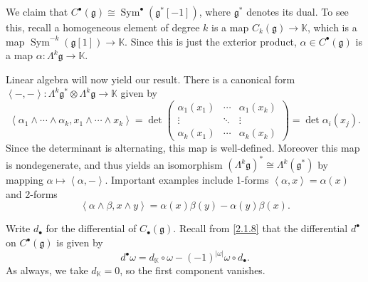 \begin{discussion}\label{3.1.3}
	We claim that $C^{\bullet} (\mathfrak{g} )\cong \operatorname{Sym} ^{\bullet} (\mathfrak{g} ^*[-1])$, where $\mathfrak{g} ^*$ denotes its dual. To see this, recall a homogeneous element of degree $k$ is a map $C_k(\mathfrak{g} )\to \mathbb{K} $, which is a map $\operatorname{Sym} ^{-k} (\mathfrak{g} [1])\to \mathbb{K} $. Since this is just the exterior product, $\alpha \in C^{\bullet} (\mathfrak{g} )$ is a map $\alpha : \Lambda ^k\mathfrak{g}  \to \mathbb{K} $.

	Linear algebra will now yield our result. There is a canonical form $\left\langle -,- \right\rangle : \Lambda ^k\mathfrak{g} ^* \otimes \Lambda ^k\mathfrak{g}  \to \mathbb{K} $ given by
	\[
		\left\langle \alpha _1 \wedge \cdots \wedge \alpha _k,x_1 \wedge \cdots \wedge x_k \right\rangle =\det \begin{pmatrix}
		\alpha _1(x_1) & \cdots  & \alpha _1(x_k) \\
		\vdots & \ddots & \vdots \\
		\alpha _k(x_1) & \cdots  & \alpha _k(x_k)
		\end{pmatrix}=\det \alpha _i(x_j)
	.\]
	Since the determinant is alternating, this map is well-defined. Moreover this map is nondegenerate, and thus yields an isomorphism $(\Lambda ^k\mathfrak{g} )^*\cong \Lambda ^k(\mathfrak{g} ^*)$ by mapping $\alpha \mapsto \left\langle \alpha ,- \right\rangle $. Important examples include 1-forms $\left\langle \alpha ,x \right\rangle =\alpha (x)$ and 2-forms
	\[
		\left\langle \alpha \wedge \beta ,x\wedge y \right\rangle =\alpha (x)\beta (y)-\alpha (y)\beta (x)
	.\]

	Write $d_{\bullet} $ for the differential of $C_{\bullet} (\mathfrak{g} )$. Recall from \cref{2.1.8} that the differential $d^{\bullet} $ on $C^{\bullet} (\mathfrak{g} )$ is given by
	\[
		d^{\bullet} \omega =d_\mathbb{K} \circ \omega  -(-1)^{\left| \omega  \right| } \omega \circ d_{\bullet} 
	.\]
	As always, we take $d_\mathbb{K} =0$, so the first component vanishes.


\end{discussion}
